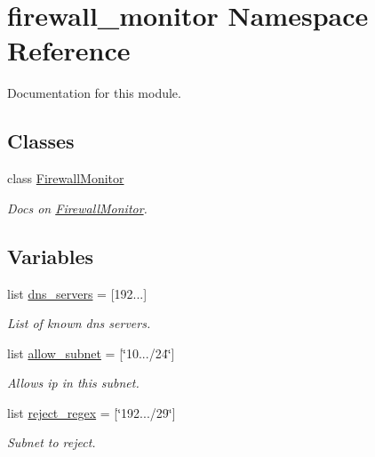 \hypertarget{namespacefirewall__monitor}{}\section{firewall\+\_\+monitor Namespace Reference}
\label{namespacefirewall__monitor}


Documentation for this module.  


\subsection*{Classes}
\begin{DoxyCompactItemize}
\item 
class \hyperlink{classfirewall__monitor_1_1FirewallMonitor}{Firewall\+Monitor}
\begin{DoxyCompactList}\small\item\em Docs on \hyperlink{classfirewall__monitor_1_1FirewallMonitor}{Firewall\+Monitor}. \end{DoxyCompactList}\end{DoxyCompactItemize}
\subsection*{Variables}
\begin{DoxyCompactItemize}
\item 
\mbox{\label{namespacefirewall__monitor_a6585908202c51cea3e24af8f353ed1fb}} 
list \hyperlink{namespacefirewall__monitor_a6585908202c51cea3e24af8f353ed1fb}{dns\+\_\+servers} = \mbox{[}\textquotesingle{}192...\textquotesingle{}\mbox{]}
\begin{DoxyCompactList}\small\item\em List of known dns servers. \end{DoxyCompactList}\item 
\mbox{\label{namespacefirewall__monitor_af975be9a092e2c88eccae9bea5dc9904}} 
list \hyperlink{namespacefirewall__monitor_af975be9a092e2c88eccae9bea5dc9904}{allow\+\_\+subnet} = \mbox{[}\char`\"{}10.../24\char`\"{}\mbox{]}
\begin{DoxyCompactList}\small\item\em Allows ip in this subnet. \end{DoxyCompactList}\item 
\mbox{\label{namespacefirewall__monitor_afaa8240fbbda1d696bcb5e88f39f61f6}} 
list \hyperlink{namespacefirewall__monitor_afaa8240fbbda1d696bcb5e88f39f61f6}{reject\+\_\+regex} = \mbox{[}\char`\"{}192.../29\char`\"{}\mbox{]}
\begin{DoxyCompactList}\small\item\em Subnet to reject. \end{DoxyCompactList}\end{DoxyCompactItemize}


